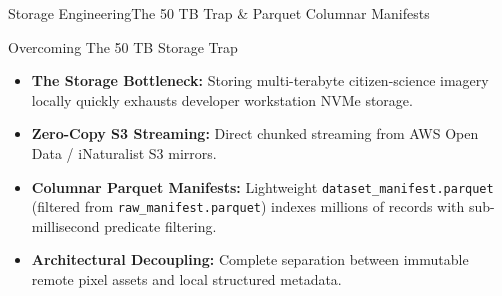 \begin{frame}{Storage Engineering}{The 50 TB Trap \& Parquet Columnar Manifests}
    \begin{block}{Overcoming The 50 TB Storage Trap}
        \begin{itemize}\small
            \item \textbf{The Storage Bottleneck:} Storing multi-terabyte citizen-science imagery locally quickly exhausts developer workstation NVMe storage.
            \item \textbf{Zero-Copy S3 Streaming:} Direct chunked streaming from AWS Open Data / iNaturalist S3 mirrors.
            \item \textbf{Columnar Parquet Manifests:} Lightweight \texttt{dataset\_manifest.parquet} (filtered from \texttt{raw\_manifest.parquet}) indexes millions of records with sub-millisecond predicate filtering.
            \item \textbf{Architectural Decoupling:} Complete separation between immutable remote pixel assets and local structured metadata.
        \end{itemize}
    \end{block}

    \vspace{0.1cm}
    \statusdone

\end{frame}

